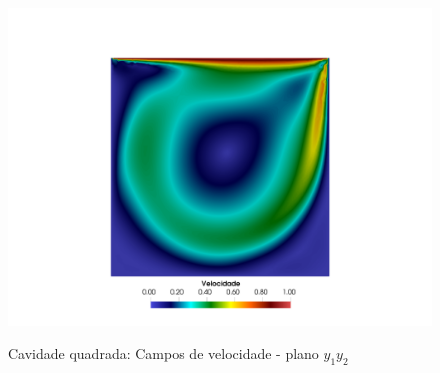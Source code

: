 \documentclass[tese_patricia]{subfiles}%
\begin{document}
\begin{figure}[!t]
	\\[3.0ex]
	\includegraphics[scale=0.4,trim=12cm 0cm 12cm 32.5cm, clip=true]{Imagens/Cap2/cavidade_velRe1000.pdf}
	\caption{Cavidade quadrada: Campos de velocidade -  plano $y_1$$y_2$}
	\label{fig:cavidade_vel}
\end{figure}
\end{document}
